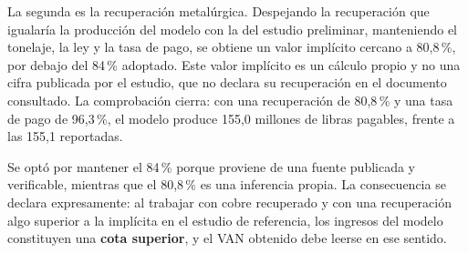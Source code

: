La segunda es la recuperación metalúrgica. Despejando la recuperación que igualaría la
producción del modelo con la del estudio preliminar, manteniendo el tonelaje, la ley y
la tasa de pago, se obtiene un valor implícito cercano a 80,8\,\%, por debajo del 84\,\%
adoptado. Este valor implícito es un cálculo propio y no una cifra publicada por el
estudio, que no declara su recuperación en el documento consultado. La comprobación
cierra: con una recuperación de 80,8\,\% y una tasa de pago de 96,3\,\%, el modelo
produce 155,0 millones de libras pagables, frente a las 155,1 reportadas.

Se optó por mantener el 84\,\% porque proviene de una fuente publicada y verificable,
mientras que el 80,8\,\% es una inferencia propia. La consecuencia se declara
expresamente: al trabajar con cobre recuperado y con una recuperación algo superior a la
implícita en el estudio de referencia, los ingresos del modelo constituyen una
\textbf{cota superior}, y el VAN obtenido debe leerse en ese sentido.
